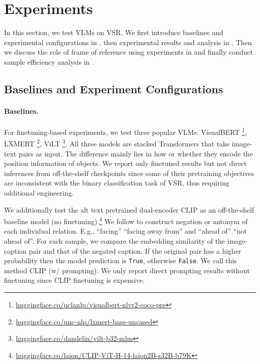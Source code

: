 \section{Experiments}\label{sec:exp}

In this section, we test VLMs on VSR. We first introduce baselines and experimental configurations in , then experimental results and analysis in . Then we discuss the role of frame of reference using experiments in  and finally conduct sample efficiency analysis in .

\subsection{Baselines and Experiment Configurations}\label{sec:baseline}

\paragraph{Baselines.} For finetuning-based experiments, we test three popular VLMs: VisualBERT \citep{li2019visualbert}\footnote{\href{https://huggingface.co/uclanlp/visualbert-nlvr2-coco-pre}{huggingface.co/uclanlp/visualbert-nlvr2-coco-pre}}, 
LXMERT \citep{tan2019lxmert}\footnote{\href{https://huggingface.co/unc-nlp/lxmert-base-uncased}{huggingface.co/unc-nlp/lxmert-base-uncased}},
ViLT \citep{kim2021vilt}\footnote{\href{https://huggingface.co/dandelin/vilt-b32-mlm}{huggingface.co/dandelin/vilt-b32-mlm}}. All three models are stacked Transformers \citep{vaswani2017attention} that take image-text pairs as input. The difference mainly lies in how or whether they encode the position information of objects. We report only finetuned results but not direct inferences from off-the-shelf checkpoints since some of their pretraining objectives are inconsistent with the binary classification task of VSR, thus requiring additional engineering.

We additionally test the alt text pretrained dual-encoder CLIP \citep{radford2021learning} as an off-the-shelf baseline model (no finetuning).\footnote{\href{https://huggingface.co/laion/CLIP-ViT-H-14-laion2B-s32B-b79K}{huggingface.co/laion/CLIP-ViT-H-14-laion2B-s32B-b79K}} We follow \citet{clip_vsr} to construct negation or antonym of each individual relation. E.g., ``facing''  ``facing away from'' and ``ahead of''  ``not ahead of''. For each sample, we compare the embedding similarity of the image-caption pair and that of the negated caption. If the original pair has a higher probability then the model prediction is \texttt{True}, otherwise \texttt{False}. We call this method CLIP (w/ prompting). We only report direct prompting results without finetuning since CLIP finetuning is expensive.









